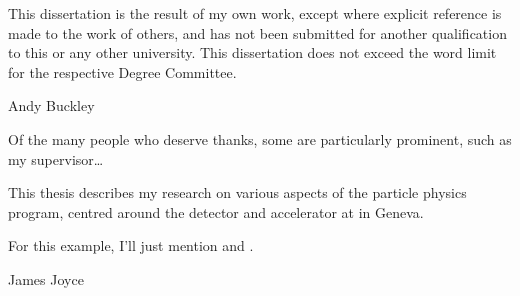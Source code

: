 \begin{declaration}
  This dissertation is the result of my own work, except where explicit
  reference is made to the work of others, and has not been submitted
  for another qualification to this or any other university. This
  dissertation does not exceed the word limit for the respective Degree
  Committee.
  \vspace*{1cm}
  \begin{flushright}
    Andy Buckley
  \end{flushright}
\end{declaration}


\begin{acknowledgements}
  Of the many people who deserve thanks, some are particularly prominent,
  such as my supervisor\dots
\end{acknowledgements}


\begin{preface}
  This thesis describes my research on various aspects of the \LHCb
  particle physics program, centred around the \LHCb detector and \LHC
  accelerator at \CERN in Geneva.

  \noindent
  For this example, I'll just mention 
  and .
\end{preface}

\tableofcontents


%
  {James Joyce}
\thispagestyle{empty}
